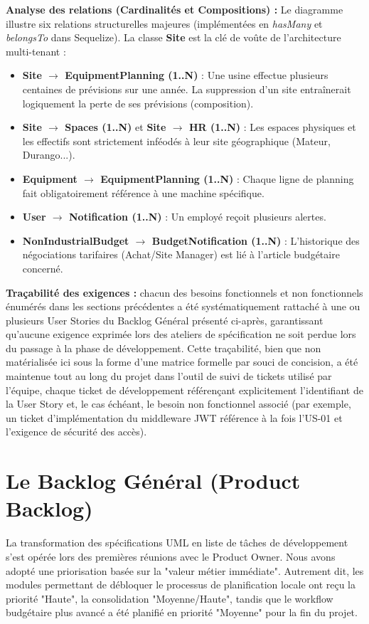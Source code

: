 \textbf{Analyse des relations (Cardinalités et Compositions) :}
Le diagramme illustre six relations structurelles majeures (implémentées en \textit{hasMany} et \textit{belongsTo} dans Sequelize). La classe \textbf{Site} est la clé de voûte de l'architecture multi-tenant :
\begin{itemize}
    \item \textbf{Site $\rightarrow$ EquipmentPlanning (1..N)} : Une usine effectue plusieurs centaines de prévisions sur une année. La suppression d'un site entraînerait logiquement la perte de ses prévisions (composition).
    \item \textbf{Site $\rightarrow$ Spaces (1..N)} et \textbf{Site $\rightarrow$ HR (1..N)} : Les espaces physiques et les effectifs sont strictement inféodés à leur site géographique (Mateur, Durango...).
    \item \textbf{Equipment $\rightarrow$ EquipmentPlanning (1..N)} : Chaque ligne de planning fait obligatoirement référence à une machine spécifique.
    \item \textbf{User $\rightarrow$ Notification (1..N)} : Un employé reçoit plusieurs alertes.
    \item \textbf{NonIndustrialBudget $\rightarrow$ BudgetNotification (1..N)} : L'historique des négociations tarifaires (Achat/Site Manager) est lié à l'article budgétaire concerné.
\end{itemize}

\textbf{Traçabilité des exigences :} chacun des besoins fonctionnels et non fonctionnels énumérés dans les sections précédentes a été systématiquement rattaché à une ou plusieurs User Stories du Backlog Général présenté ci-après, garantissant qu'aucune exigence exprimée lors des ateliers de spécification ne soit perdue lors du passage à la phase de développement. Cette traçabilité, bien que non matérialisée ici sous la forme d'une matrice formelle par souci de concision, a été maintenue tout au long du projet dans l'outil de suivi de tickets utilisé par l'équipe, chaque ticket de développement référençant explicitement l'identifiant de la User Story et, le cas échéant, le besoin non fonctionnel associé (par exemple, un ticket d'implémentation du middleware JWT référence à la fois l'US-01 et l'exigence de sécurité des accès).

\section{Le Backlog Général (Product Backlog)}
La transformation des spécifications UML en liste de tâches de développement s'est opérée lors des premières réunions avec le Product Owner. Nous avons adopté une priorisation basée sur la "valeur métier immédiate". Autrement dit, les modules permettant de débloquer le processus de planification locale ont reçu la priorité "Haute", la consolidation "Moyenne/Haute", tandis que le workflow budgétaire plus avancé a été planifié en priorité "Moyenne" pour la fin du projet. 

